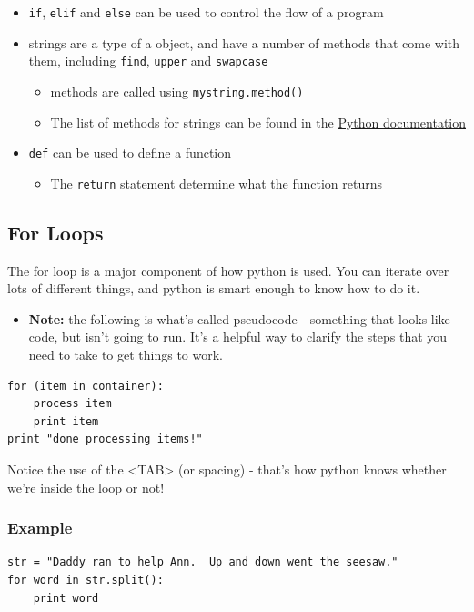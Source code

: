 \documentclass[11pt]{article}
\begin{document}
\begin{itemize}
\item \texttt{if}, \texttt{elif} and \texttt{else} can be used to control the flow of a program
\item strings are a type of a object, and have a number of methods that
  come with them, including \texttt{find}, \texttt{upper} and \texttt{swapcase}
\begin{itemize}
\item methods are called using \texttt{mystring.method()}
\item The list of methods for strings can be found in the \href{http://docs.python.org/library/stdtypes.html}{Python documentation}
\end{itemize}
\item \texttt{def} can be used to define a function
\begin{itemize}
\item The \texttt{return} statement determine what the function returns
\end{itemize}
\end{itemize}
\subsection{For Loops}
\label{sec-2-4}

   The for loop is a major component of how python is used.  You can
   iterate over lots of different things, and python is smart enough
   to know how to do it.  
\begin{itemize}
\item \textbf{Note:} the following is what's called pseudocode - something
     that looks like code, but isn't going to run.  It's a helpful way
     to clarify the steps that you need to take to get things to
     work.
\end{itemize}

\begin{verbatim}
for (item in container):
    process item
    print item
print "done processing items!"
\end{verbatim}


   Notice the use of the <TAB> (or spacing) - that's how python knows whether we're
   inside the loop or not!
\subsubsection{Example}
\label{sec-2-4-1}


\begin{verbatim}
str = "Daddy ran to help Ann.  Up and down went the seesaw."      
for word in str.split():
    print word
\end{verbatim}
\end{document}
